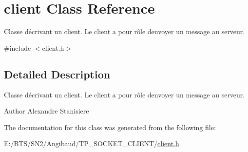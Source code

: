 \hypertarget{classclient}{}\section{client Class Reference}
\label{classclient}


Classe décrivant un client. Le client a pour rôle d\textquotesingle{}envoyer un message au serveur.  




{\ttfamily \#include $<$client.\+h$>$}



\subsection{Detailed Description}
Classe décrivant un client. Le client a pour rôle d\textquotesingle{}envoyer un message au serveur. 

\begin{DoxyAuthor}{Author}
Alexandre Stanisiere 
\end{DoxyAuthor}


The documentation for this class was generated from the following file\+:\begin{DoxyCompactItemize}
\item 
E\+:/\+B\+T\+S/\+S\+N2/\+Angibaud/\+T\+P\+\_\+\+S\+O\+C\+K\+E\+T\+\_\+\+C\+L\+I\+E\+N\+T/\mbox{\hyperlink{client_8h}{client.\+h}}\end{DoxyCompactItemize}
